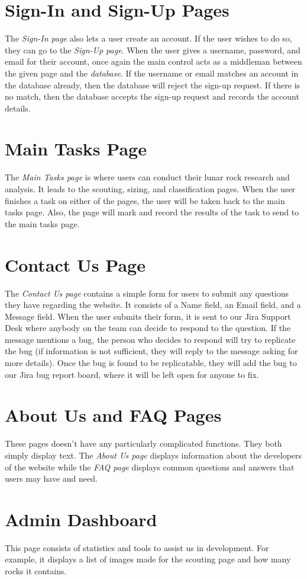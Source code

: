 \documentclass{article}
\begin{document}
\section{Sign-In and Sign-Up Pages}
The \textit{Sign-In page} also lets a user create an account. If the user wishes to do so, they can go to the \textit{Sign-Up page}. When the user gives a username, password, and email for their account, once again the main control acts as a middleman between the given page and the \textit{database}. If the username or email matches an account in the database already, then the database will reject the sign-up request. If there is no match, then the database accepts the sign-up request and records the account details.

\section{Main Tasks Page}
The \textit{Main Tasks page} is where users can conduct their lunar rock research and analysis. It leads to the scouting, sizing, and classification pages. When the user finishes a task on either of the pages, the user will be taken back to the main tasks page. Also, the page will mark and record the results of the task to send to the main tasks page.

\section{Contact Us Page}
The \textit{Contact Us page} contains a simple form for users to submit any questions they have regarding the website. It consists of a Name field, an Email field, and a Message field. When the user submits their form, it is sent to our Jira Support Desk where anybody on the team can decide to respond to the question. If the message mentions a bug, the person who decides to respond will try to replicate the bug (if information is not sufficient, they will reply to the message asking for more details). Once the bug is found to be replicatable, they will add the bug to our Jira bug report board, where it will be left open for anyone to fix.

\section{About Us and FAQ Pages}
These pages doesn't have any particularly complicated functions. They both simply display text. The \textit{About Us page} displays information about the developers of the website while the \textit{FAQ page} displays common questions and answers that users may have and need.

\section{Admin Dashboard}
This page consists of statistics and tools to assist us in development. For example, it displays a list of images made for the scouting page and how many rocks it contains.
\end{document}
